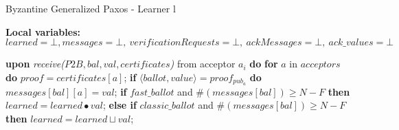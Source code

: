\begin{algorithm}
	\caption{Byzantine Generalized Paxos - Learner l}
	\label{BFT-Learn}
	\textbf{Local variables: } $learned = \bot, messages = \bot,\ verificationRequests = \bot,\ ackMessages = \bot,\ ack\_values = \bot$ 
	\begin{algorithmic}[1]
		\State \textbf{upon} \textit{receive($P2B, bal, val, certificates$)} from acceptor $a_i$ \textbf{do}
		\State \hspace{\algorithmicindent}\textbf{for} $a$ in $acceptors$ \textbf{do} 
		\State \hspace{\algorithmicindent}\hspace{\algorithmicindent} $proof = certificates[a]$;
		\State \hspace{\algorithmicindent}\hspace{\algorithmicindent} \textbf{if} $\langle ballot, value \rangle = proof_{pub_a}$ \textbf{do}
		\State \hspace{\algorithmicindent}\hspace{\algorithmicindent}\hspace{\algorithmicindent} $messages[bal][a] = val$;
		\State
		\State \hspace{\algorithmicindent} \textbf{if} $fast\_ballot$ and $\#(messages[bal]) \geq N-F$ \textbf{then}
		\State\hspace{\algorithmicindent}\hspace{\algorithmicindent} $learned = learned \bullet val$;
		\State \hspace{\algorithmicindent} \textbf{else if} $classic\_ballot$ and $\#(messages[bal]) \geq N-F$ \textbf{then}
		\State \hspace{\algorithmicindent} \hspace{\algorithmicindent} $learned = learned \sqcup val$;
		
	\end{algorithmic}
\end{algorithm}